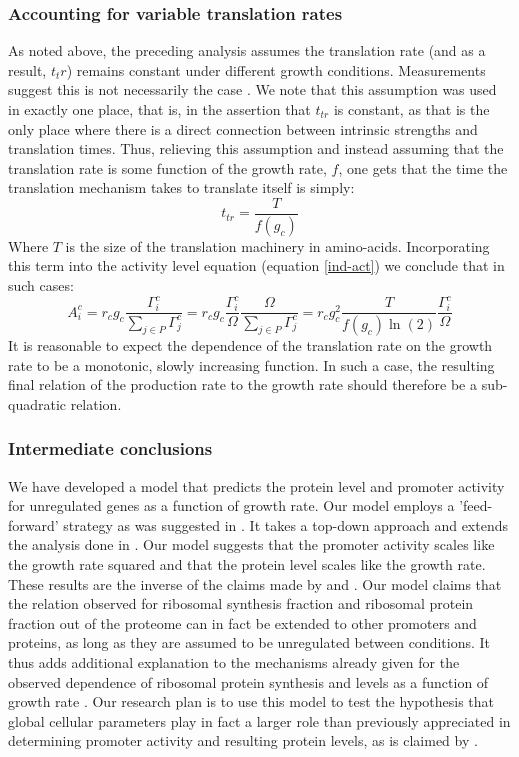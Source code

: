 \documentclass[a4page]{report}
\begin{document}
\subsubsection{Accounting for variable translation rates}
As noted above, the preceding analysis assumes the translation rate (and as a result, $t_tr$) remains constant under different growth conditions.
Measurements suggest this is not necessarily the case \cite{Liang2000}.
We note that this assumption was used in exactly one place, that is, in the assertion that $t_{tr}$ is constant, as that is the only place where there is a direct connection between intrinsic strengths and translation times.
Thus, relieving this assumption and instead assuming that the translation rate is some function of the growth rate, $f$, one gets that the time the translation mechanism takes to translate itself is simply:
\begin{equation}
t_{tr}=\frac{T}{f(g_c)}
\end{equation}
Where $T$ is the size of the translation machinery in amino-acids.
Incorporating this term into the activity level equation (equation \ref{ind-act}) we conclude that in such cases:
\begin{equation}
A^c_i=r_c g_c \frac{\Gamma^c_i}{\sum_{j\in P}\Gamma^c_j}=r_c g_c \frac{\Gamma^c_i}{\Omega}\frac{\Omega}{\sum_{j\in P}\Gamma^c_j}=r_c g_c^2\frac{T}{f(g_c)\ln(2)}\frac{\Gamma^c_i}{\Omega}
\end{equation}
It is reasonable to expect the dependence of the translation rate on the growth rate to be a monotonic, slowly increasing function.
In such a case, the resulting final relation of the production rate to the growth rate should therefore be a sub-quadratic relation.
\subsubsection{Intermediate conclusions}
We have developed a model that predicts the protein level and promoter activity for unregulated genes as a function of growth rate.
Our model employs a 'feed-forward' strategy as was suggested in \cite{Levy2009}.
It takes a top-down approach and extends the analysis done in \cite{Leeat2013}.
Our model suggests that the promoter activity scales like the growth rate squared and that the protein level scales like the growth rate.
These results are the inverse of the claims made by \cite{Klumpp2009a} and \cite{Scott2010b}.
Our model claims that the relation observed for ribosomal synthesis fraction \cite{Zaslaver2009a} and ribosomal protein fraction \cite{Maaloe1969,ingraham1983growth} out of the proteome can in fact be extended to other promoters and proteins, as long as they are assumed to be unregulated between conditions.
It thus adds additional explanation to the mechanisms already given for the observed dependence of ribosomal protein synthesis and levels as a function of growth rate \cite{Zaslaver2009a}.
Our research plan is to use this model to test the hypothesis that global cellular parameters play in fact a larger role than previously appreciated in determining promoter activity and resulting protein levels, as is claimed by \cite{Berthoumieux2013}.
\end{document}
